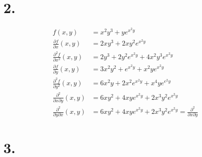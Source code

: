 \documentclass[a4paper]{scrartcl}
\begin{document}
\newpage
\section{2.}
\begin{align}
f(x,y) &= x^2y^3+ye^{x^2 y} \\
\frac {\partial f} {\partial x}(x,y) &= 2xy^3 + 2xy^2 e^{x^2 y} \\
\frac {\partial ^2f} {\partial x^2}(x,y) &= 2y^3 + 2y^2e^{x^2 y} + 4x^2y^3e^{x^2 y} \\
\frac {\partial f} {\partial y}(x,y) &= 3x^2y^2 + e^{x^2 y} + x^2 y e^{x^2 y} \\
\frac {\partial ^2f} {\partial y^2}(x,y) &= 6x^2y + 2x^2e^{x^2 y} + x^4ye^{e^2 y} \\
\frac {\partial ^2} {\partial x\partial y}(x,y) &= 6xy^2 + 4xye^{x^2 y} + 2x^3y^2e^{x^2 y} \\
\frac {\partial ^2} {\partial y\partial x}(x,y) &= 6xy^2 + 4xye^{x^2 y} + 2x^3y^2e^{x^2 y} = \frac {\partial ^2} {\partial x\partial y}
\end{align}

\newpage
\section{3.}
\end{document}
